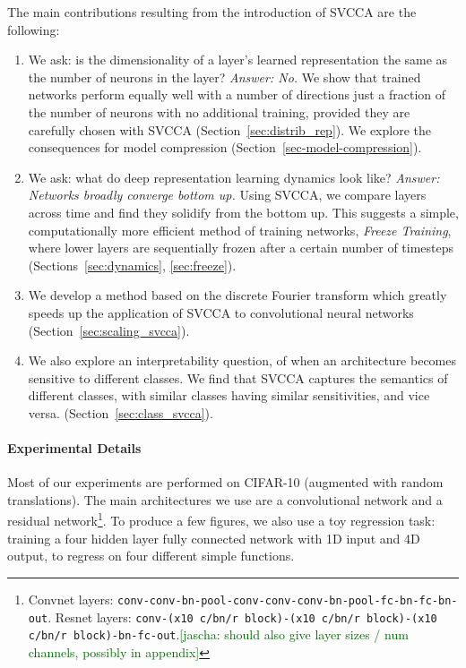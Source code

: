 \documentclass{article} %
\newcommand{\comments}[1]{#1}
\newcommand{\comments}[1]{}
\newcommand{\jcom}[1]{\comments{\textcolor{darkgreen}{[jascha: #1]}}}
\begin{document}
The main contributions resulting from the introduction of SVCCA are the following:
\begin{enumerate}  
    \item We ask: is the dimensionality of a layer's learned representation the same as the number of neurons in the layer? \textit{Answer: No.} We show that %
    trained networks perform equally well with a number of directions just a fraction of the number of neurons with no additional training, provided they are carefully chosen with SVCCA (Section~\ref{sec:distrib_rep}). We explore the consequences for model compression (Section~\ref{sec-model-compression}).
    \item We ask: what do deep representation learning dynamics look like? \textit{Answer: Networks broadly converge bottom up.} Using SVCCA, we compare layers across time and find they solidify from the bottom up. This suggests a simple, computationally more efficient method of training networks, \textit{Freeze Training}, where lower layers are sequentially frozen after a certain number of timesteps (Sections~\ref{sec:dynamics}, \ref{sec:freeze}).
    \item We develop a method based on the discrete Fourier transform which greatly speeds up the application of SVCCA to convolutional neural networks (Section~\ref{sec:scaling_svcca}).
    \item We also explore an interpretability question, of when an architecture becomes sensitive to different classes. We find that SVCCA captures the semantics of different classes, with similar classes having similar sensitivities, and vice versa. (Section~\ref{sec:class_svcca}).
\end{enumerate}


\paragraph{Experimental Details}
\label{sec-exp-details}
Most of our experiments are performed on CIFAR-10 (augmented with random translations). The main architectures we use are a convolutional network and a residual network\footnote{Convnet layers: \texttt{\footnotesize conv-conv-bn-pool-conv-conv-conv-bn-pool-fc-bn-fc-bn-out}. Resnet layers: \texttt{conv-(x10 c/bn/r block)-(x10 c/bn/r block)-(x10 c/bn/r block)-bn-fc-out}.\jcom{should also give layer sizes / num channels, possibly in appendix}}. To produce a few figures, we also use a toy regression task: training a four hidden layer fully connected network with 1D input and 4D output, to regress on four different simple functions.
\end{document}
